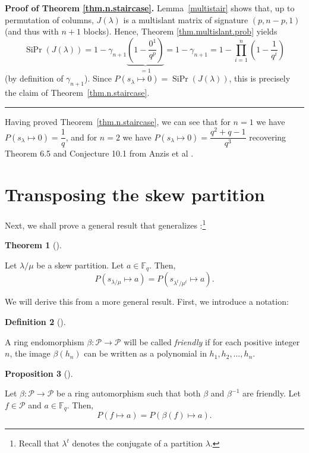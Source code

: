 \documentclass[numbers=enddot,12pt,final,onecolumn,notitlepage]{scrartcl}%
\theoremstyle{definition}
\newtheorem{theo}{Theorem}[section]
\newenvironment{theorem}[1][]
{\begin{theo}[#1]\begin{leftbar}}
{\end{leftbar}\end{theo}}
\newtheorem{prop}[theo]{Proposition}
\newenvironment{proposition}[1][]
{\begin{prop}[#1]\begin{leftbar}}
{\end{leftbar}\end{prop}}
\newtheorem{defi}[theo]{Definition}
\newenvironment{definition}[1][]
{\begin{defi}[#1]\begin{leftbar}}
{\end{leftbar}\end{defi}}
\newenvironment{proof}[1][Proof]{\noindent\textbf{#1.} }{\ \rule{0.5em}{0.5em}}
\let\prodnonlimits\prod
\renewcommand{\prod}{\prodnonlimits\limits}
\newcommand{\tup}[1]{\left( #1 \right)}
\theoremstyle{plainsl}
\begin{document}
\begin{proof}[Proof of Theorem \ref{thm.n.staircase}]
Lemma~\ref{multistair} shows that, up to permutation of columns,
$J(\lambda)$ is a multislant matrix of signature $(p, n-p, 1)$
(and thus with $n+1$ blocks).
Hence, Theorem \ref{thm.multislant.prob} yields
\[
\operatorname*{SiPr}\tup{J\tup{\lambda}}
= 1 - \gamma_{n+1} \underbrace{\tup{1 - \dfrac{0^1}{q^p}}}_{= 1}
= 1 - \gamma_{n+1}
= 1 - \prod_{i=1}^{n} \left(  1-\dfrac{1}{q^{i}}\right)
\]
(by definition of $\gamma_{n+1}$).
Since $P(s_{\lambda} \longmapsto 0) = \operatorname*{SiPr}\tup{J\tup{\lambda}}$,
this is precisely the claim of Theorem~\ref{thm.n.staircase}.
\end{proof}

Having proved Theorem~\ref{thm.n.staircase}, we can see that for $n=1$
we have
$P(s_{\lambda} \longmapsto 0) = \dfrac{1}{q}$, and for $n=2$ we have
$P(s_{\lambda} \longmapsto 0) = \dfrac{q^2+q-1}{q^3}$
recovering Theorem 6.5 and Conjecture 10.1 from Anzis et al \cite{Anzis18}.


\section{Transposing the skew partition}

Next, we shall prove a general result that generalizes \cite[Corollary
3.3]{Anzis18}:\footnote{Recall that $\lambda^{t}$ denotes the conjugate of a
partition $\lambda$.}

\begin{theorem}
\label{thm.transpose}Let $\lambda/\mu$ be a skew partition. Let $a\in
\mathbb{F}_{q}$. Then,
\[
P\left(  s_{\lambda/\mu}\mapsto a\right)  =P\left(  s_{\lambda^{t}/\mu^{t}%
}\mapsto a\right)  .
\]

\end{theorem}

We will derive this from a more general result. First, we introduce a notation:

\begin{definition}
A ring endomorphism $\beta:\mathcal{P}\rightarrow\mathcal{P}$ will be called
\emph{friendly} if for each positive integer $n$, the image $\beta\left(
h_{n}\right)  $ can be written as a polynomial in $h_{1},h_{2},\ldots,h_{n}$.
\end{definition}

\begin{proposition}
\label{prop.friendly-aut}Let $\beta:\mathcal{P}\rightarrow\mathcal{P}$ be a
ring automorphism such that both $\beta$ and $\beta^{-1}$ are friendly. Let
$f\in\mathcal{P}$ and $a\in\mathbb{F}_{q}$. Then,%
\[
P\left(  f\mapsto a\right)  =P\left(  \beta\left(  f\right)  \mapsto a\right)
.
\]

\end{proposition}
\end{document}
